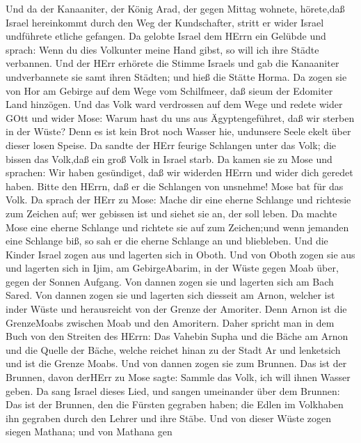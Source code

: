  Und da der Kanaaniter, der König Arad, der gegen Mittag
wohnete, hörete,daß Israel hereinkommt durch den Weg der Kundschafter,
stritt er wider Israel undführete etliche gefangen.  Da
gelobte Israel dem HErrn ein Gelübde und sprach: Wenn du dies Volkunter
meine Hand gibst, so will ich ihre Städte verbannen.  Und
der HErr erhörete die Stimme Israels und gab die Kanaaniter
undverbannete sie samt ihren Städten; und hieß die Stätte Horma.
 Da zogen sie von Hor am Gebirge auf dem Wege vom
Schilfmeer, daß sieum der Edomiter Land hinzögen. Und das Volk ward
verdrossen auf dem Wege  und redete wider GOtt und wider
Mose: Warum hast du uns aus Ägyptengeführet, daß wir sterben in der
Wüste? Denn es ist kein Brot noch Wasser hie, undunsere Seele ekelt über
dieser losen Speise.  Da sandte der HErr feurige Schlangen
unter das Volk; die bissen das Volk,daß ein groß Volk in Israel starb.
 Da kamen sie zu Mose und sprachen: Wir haben gesündiget,
daß wir widerden HErrn und wider dich geredet haben. Bitte den HErrn,
daß er die Schlangen von unsnehme! Mose bat für das Volk. 
Da sprach der HErr zu Mose: Mache dir eine eherne Schlange und richtesie
zum Zeichen auf; wer gebissen ist und siehet sie an, der soll leben.
 Da machte Mose eine eherne Schlange und richtete sie auf
zum Zeichen;und wenn jemanden eine Schlange biß, so sah er die eherne
Schlange an und bliebleben.  Und die Kinder Israel zogen
aus und lagerten sich in Oboth.  Und von Oboth zogen sie
aus und lagerten sich in Ijim, am GebirgeAbarim, in der Wüste gegen Moab
über, gegen der Sonnen Aufgang.  Von dannen zogen sie und
lagerten sich am Bach Sared.  Von dannen zogen sie und
lagerten sich diesseit am Arnon, welcher ist inder Wüste und
herausreicht von der Grenze der Amoriter. Denn Arnon ist die GrenzeMoabs
zwischen Moab und den Amoritern.  Daher spricht man in dem
Buch von den Streiten des HErrn: Das Vahebin Supha und die Bäche am
Arnon  und die Quelle der Bäche, welche reichet hinan zu
der Stadt Ar und lenketsich und ist die Grenze Moabs.  Und
von dannen zogen sie zum Brunnen. Das ist der Brunnen, davon derHErr zu
Mose sagte: Sammle das Volk, ich will ihnen Wasser geben. 
Da sang Israel dieses Lied, und sangen umeinander über dem Brunnen:
 Das ist der Brunnen, den die Fürsten gegraben haben; die
Edlen im Volkhaben ihn gegraben durch den Lehrer und ihre Stäbe. Und von
dieser Wüste zogen siegen Mathana;  und von Mathana gen

